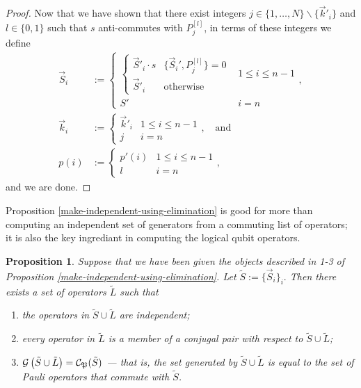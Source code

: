\documentclass[twocolumn,showpacs,preprintnumbers,amsmath,amssymb,nofootinbib,pra,floatfix]{revtex4-1}
\newtheorem{proposition}{Proposition}
\newenvironment{remark}[1][Remark]{\begin{trivlist}
\item[\hskip \labelsep {\bfseries #1}]}{\end{trivlist}}
\newcommand{\lst}{\vec}
\newcommand{\set}{\tilde}
\newcommand{\genfun}{\mathcal{G}}
\newcommand{\pauligroup}{\mathfrak{P}}
\newcommand{\centralizer}{\mathcal{C}}
\begin{document}
\begin{proof}
Now that we have shown that there exist integers $j\in\{1,\dots,N\}\backslash\{\lst k'_i\}$ and $l\in\{0,1\}$ such that $s$ anti-commutes with $P_{j}^{[l]}$, in terms of these integers we define
$$
\begin{aligned}
\lst S_i &:= 
\begin{cases}
\begin{cases}
\lst S'_i \cdot s & \{\lst S_i',P_j^{[l]}\}=0 \\
\lst S'_i & \text{otherwise}
\end{cases} & 1\le i\le n-1 \\
S' & i=n
\end{cases}, \\
\lst k_i &:=
\begin{cases}
\lst k'_i & 1 \le i \le n-1 \\
j & i=n
\end{cases},\quad \text{and} \\
p(i) &:=
\begin{cases}
p'(i) & 1 \le i \le n-1\\
l & i=n
\end{cases},
\end{aligned}
$$ and we are done.
\end{proof}
\begin{remark}
Proposition \ref{make-independent-using-elimination} is good for more than computing an independent set of generators from a commuting list of operators;  it is also the key ingrediant in computing the logical qubit operators.
\end{remark}

\begin{proposition}
\label{construction-of-logicals}
Suppose that we have been given the objects described in 1-3 of Proposition \ref{make-independent-using-elimination}.  Let $\set S := \{\vec S_i\}_i.$  Then there exists a set of operators $\set L$ such that
\begin{enumerate}
\item \label{L-are-independent} the operators in $\set S\cup\set L$ are independent;
\item \label{L-are-conjugal-pairs} every operator in $\set L$ is a member of a conjugal pair with respect to $\set S\cup\set L$;
\item \label{L-completes-the-generators} $\genfun\paren{\set S\cup\set L}=\centralizer_\pauligroup(\set S)$ --- that is, the set generated by $\set S\cup\set L$ is equal to the set of Pauli operators that commute with $\set S$.
\end{enumerate}
\end{proposition}
\end{document}
